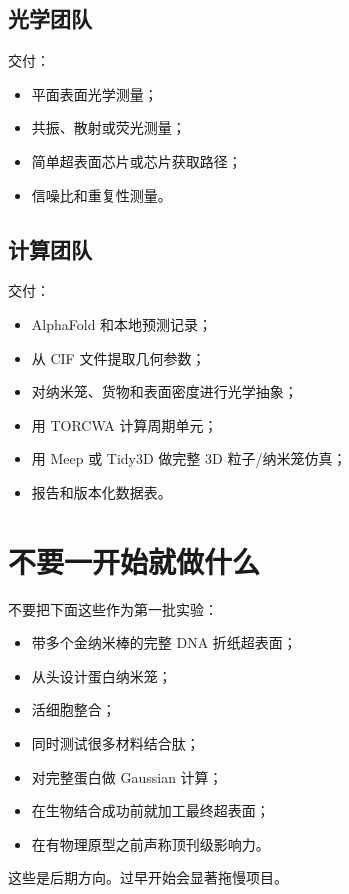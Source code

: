 \documentclass[11pt]{ctexart}
\newcommand{\af}{AlphaFold}
\begin{document}
\subsection{光学团队}

交付：

\begin{itemize}
\item 平面表面光学测量；
\item 共振、散射或荧光测量；
\item 简单超表面芯片或芯片获取路径；
\item 信噪比和重复性测量。
\end{itemize}

\subsection{计算团队}

交付：

\begin{itemize}
\item \af{} 和本地预测记录；
\item 从 CIF 文件提取几何参数；
\item 对纳米笼、货物和表面密度进行光学抽象；
\item 用 TORCWA 计算周期单元；
\item 用 Meep 或 Tidy3D 做完整 3D 粒子/纳米笼仿真；
\item 报告和版本化数据表。
\end{itemize}

\section{不要一开始就做什么}

不要把下面这些作为第一批实验：

\begin{itemize}
\item 带多个金纳米棒的完整 DNA 折纸超表面；
\item 从头设计蛋白纳米笼；
\item 活细胞整合；
\item 同时测试很多材料结合肽；
\item 对完整蛋白做 Gaussian 计算；
\item 在生物结合成功前就加工最终超表面；
\item 在有物理原型之前声称顶刊级影响力。
\end{itemize}

这些是后期方向。过早开始会显著拖慢项目。
\end{document}
